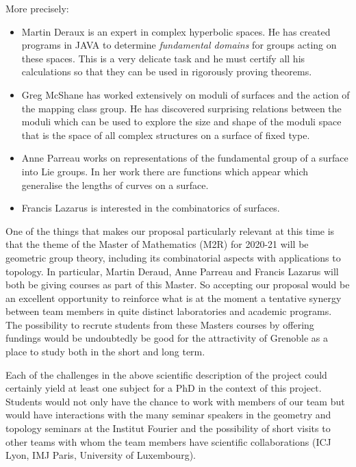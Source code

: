 \documentclass[14pt,fleqn]{article}
\begin{document}
More precisely:
\begin{itemize}
\item Martin Deraux is an expert in complex hyperbolic spaces. He has created programs in JAVA to determine 
\textit{fundamental domains} for groups acting on these spaces. This is a very delicate task and he must certify all his calculations so that they can be used in rigorously proving theorems.
\item Greg McShane has worked extensively on moduli of surfaces and the action of the mapping class group. He has discovered surprising relations between the moduli which can be used to explore the size and shape of the moduli space that is the space of all complex structures on a surface of fixed type.
\item Anne Parreau works on representations of the fundamental group of a surface into Lie groups. 
In her work there are functions which appear which generalise the lengths of curves on a surface.
\item Francis Lazarus is interested in the combinatorics of surfaces.

\end{itemize}

\vspace{.25in}



One of the things that makes
our proposal particularly relevant
at this time is that
the theme of the  Master of
Mathematics (M2R) for 2020-21
will be  geometric group theory, 
including its combinatorial aspects with applications to topology. 
In particular, Martin Deraud, Anne Parreau and Francis Lazarus will both be giving courses as part of  this Master. 
So accepting our proposal 
would be  an excellent opportunity 
to reinforce
what is at the moment a tentative synergy 
between team members in
quite distinct laboratories and
academic programs. 
The possibility to recrute 
students from these Masters courses
by offering fundings 
would be undoubtedly 
be good for the attractivity
of Grenoble as a place to study
both in the short and long term. 

Each of the challenges  in the above scientific description of the project
could certainly yield 
at least one subject for a PhD
in the context of this project.
Students would not only have the chance
to work with members of our team 
but would have interactions with
the  many seminar speakers 
in the geometry and topology seminars 
at the Institut Fourier
and the possibility of short visits
to other teams with whom the team members
have scientific collaborations
(ICJ Lyon, IMJ Paris, University of Luxembourg).
\end{document}
